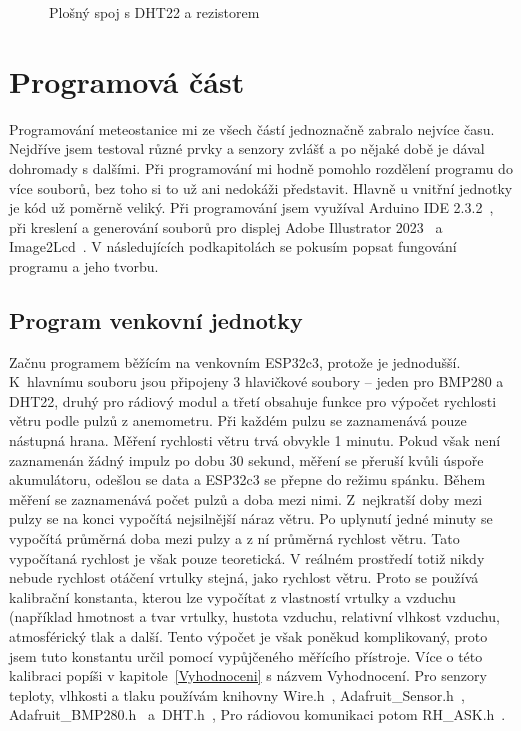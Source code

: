             \begin{figure}[htb]
            \caption{Plošný spoj s DHT22 a rezistorem}
            \label{DHT22}
            \end{figure}

        \clearpage

    \section{Programová část} \label{PrgCast}
        Programování meteostanice mi ze všech částí jednoznačně zabralo nejvíce času. Nejdříve jsem testoval různé prvky a senzory zvlášť a po nějaké době je dával dohromady s dalšími. Při programování mi hodně pomohlo rozdělení programu do více souborů, bez toho si to už ani nedokáži představit. Hlavně u vnitřní jednotky je kód už poměrně veliký. Při programování jsem využíval Arduino IDE 2.3.2~\cite{ArduinoIDE}, při kreslení a generování souborů pro displej Adobe Illustrator 2023~\cite{Illustrator} a Image2Lcd~\cite{Image2Lcd}. V následujících podkapitolách se pokusím popsat fungování programu a jeho tvorbu.

        \subsection{Program venkovní jednotky}
            Začnu programem běžícím na venkovním ESP32c3, protože je jednodušší. K~hlavnímu souboru jsou připojeny 3 hlavičkové soubory – jeden pro BMP280 a DHT22, druhý pro rádiový modul a třetí obsahuje funkce pro výpočet rychlosti větru podle pulzů z anemometru. Při každém pulzu se zaznamenává pouze nástupná hrana. Měření rychlosti větru trvá obvykle 1 minutu. Pokud však není zaznamenán žádný impulz po dobu 30 sekund, měření se přeruší kvůli úspoře akumulátoru, odešlou se data a ESP32c3 se přepne do režimu spánku. Během měření se zaznamenává počet pulzů a doba mezi nimi. Z~nejkratší doby mezi pulzy se na konci vypočítá nejsilnější náraz větru. Po uplynutí jedné minuty se vypočítá průměrná doba mezi pulzy a z ní průměrná rychlost větru. Tato vypočítaná rychlost je však pouze teoretická. V reálném prostředí totiž nikdy nebude rychlost otáčení vrtulky stejná, jako rychlost větru. Proto se používá kalibrační konstanta, kterou lze vypočítat z vlastností vrtulky a vzduchu (například hmotnost a tvar vrtulky, hustota vzduchu, relativní vlhkost vzduchu, atmosférický tlak a další. Tento výpočet je však poněkud komplikovaný, proto jsem tuto konstantu určil pomocí vypůjčeného měřícího přístroje. Více o této kalibraci popíši v kapitole~\ref{Vyhodnoceni} s názvem Vyhodnocení. Pro senzory teploty, vlhkosti a tlaku používám knihovny Wire.h~\cite{Wire}, \hbox{Adafruit\_Sensor.h}~\cite{AdafruitSensor}, \hbox{Adafruit\_BMP280.h}~\cite{AdafruitBMP280Library} a~DHT.h~\cite{DHTsensorLibrary}, Pro rádiovou komunikaci potom \hbox{RH\_ASK.h}~\cite{RHASK}.


